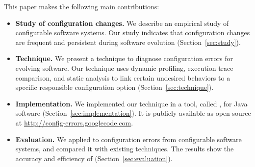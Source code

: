 This paper makes the following main contributions:

\begin{itemize}
\vspace{-3mm}
\item \textbf{Study of configuration changes.} We describe an empirical
study of \studysubjnum configurable software systems.
Our study indicates that configuration changes
are frequent and persistent during software evolution (Section~\ref{sec:study}).

\item \textbf{Technique.} We present a technique to diagnose
configuration errors for evolving software. Our technique
uses dynamic profiling, execution trace comparison, and
static analysis to link certain undesired behaviors to a
specific responsible configuration option (Section~\ref{sec:technique}).

\item \textbf{Implementation.} We implemented our technique
in a tool, called \ourtool, for Java software (Section~\ref{sec:implementation}).
It is publicly available as open source at \url{http://config-errors.googlecode.com}.

\item \textbf{Evaluation.} We applied \ourtool to \errornum configuration
errors from \subjnum configurable software systems,
and compared it with existing techniques.
The results show the accuracy and efficiency of \ourtool (Section~\ref{sec:evaluation}).
\end{itemize}

